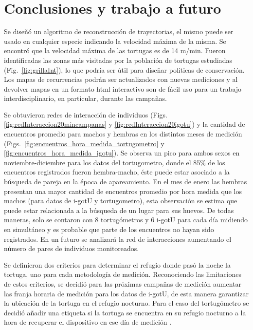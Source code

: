 \chapter{Conclusiones y trabajo a futuro}
 
Se diseñó un algoritmo de reconstrucción de trayectorias, el mismo puede ser usado en cualquier especie indicando la velocidad máxima de la misma. Se encontró que la velocidad máxima de las tortugas es de 14 m/min. Fueron identificadas las zonas más visitadas por la población de tortugas estudiadas (Fig.~\ref{fig:grillaInt}), lo que podría ser útil para diseñar políticas de conservación. Los mapas de recurrencias podrán ser actualizados con nuevas mediciones y al devolver mapas en un formato html interactivo son de fácil uso para un trabajo interdisciplinario, en particular, durante las campañas.
 
Se obtuvieron redes  de interacción de individuos (Figs. \ref{fig:redInteraccion20mincampanas} y \ref{fig:redInteraccion20igotu}) y la cantidad de encuentros promedio para machos y hembras en los distintos meses de medición (Figs.~\ref{fig:encuentros_hora_medida_tortugometro} y \ref{fig:encuentros_hora_medida_igotu}). Se observa un pico para ambos sexos en noviembre-diciembre para los datos del tortugometro, donde el 85\% de los encuentros registrados fueron hembra-macho, éste puede estar asociado a la búsqueda de pareja en la época de apareamiento. En el mes de enero las hembras presentan una mayor cantidad de encuentros promedio por hora medida que los machos (para datos de i-gotU y tortugometro), esta observación se estima que puede estar relacionada a la búsqueda de un lugar para sus huevos. De todas maneras, solo se contaron con 8 tortugómetros y 6 i-gotU  para cada día midiendo en simultáneo y es probable que parte de los encuentros no hayan sido registrados. En un futuro se analizará la red de interacciones aumentando el número de pares de individuos monitoreados.
 
 
Se definieron dos criterios para determinar el refugio donde pasó la noche la tortuga, uno para cada metodología de medición. Reconociendo las limitaciones de estos criterios, se decidió para las próximas campañas de medición aumentar las franja horaria de medición para los datos de i-gotU, de esta manera garantizar la ubicación de la tortuga en el refugio nocturno. Para el caso del tortugómetro se decidió añadir una etiqueta si la tortuga se encuentra en su refugio nocturno a la hora de recuperar el dispositivo en ese día de medición .
 
